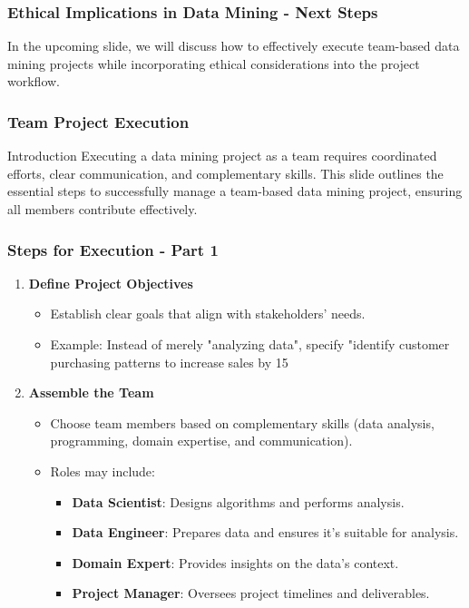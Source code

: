 \documentclass[aspectratio=169]{beamer}
\begin{document}
\begin{frame}[fragile]
    \frametitle{Ethical Implications in Data Mining - Next Steps}
    In the upcoming slide, we will discuss how to effectively execute team-based data mining projects while incorporating ethical considerations into the project workflow. 
\end{frame}

\begin{frame}
    \frametitle{Team Project Execution}
    \begin{block}{Introduction}
        Executing a data mining project as a team requires coordinated efforts, clear communication, and complementary skills. This slide outlines the essential steps to successfully manage a team-based data mining project, ensuring all members contribute effectively.
    \end{block}
\end{frame}

\begin{frame}
    \frametitle{Steps for Execution - Part 1}
    \begin{enumerate}
        \item \textbf{Define Project Objectives}
            \begin{itemize}
                \item Establish clear goals that align with stakeholders' needs.
                \item Example: Instead of merely "analyzing data", specify "identify customer purchasing patterns to increase sales by 15%
            \end{itemize}
        
        \item \textbf{Assemble the Team}
            \begin{itemize}
                \item Choose team members based on complementary skills (data analysis, programming, domain expertise, and communication).
                \item Roles may include:
                \begin{itemize}
                    \item \textbf{Data Scientist}: Designs algorithms and performs analysis.
                    \item \textbf{Data Engineer}: Prepares data and ensures it’s suitable for analysis.
                    \item \textbf{Domain Expert}: Provides insights on the data’s context.
                    \item \textbf{Project Manager}: Oversees project timelines and deliverables.
                \end{itemize}
            \end{itemize}
    \end{enumerate}
\end{frame}
\end{document}
